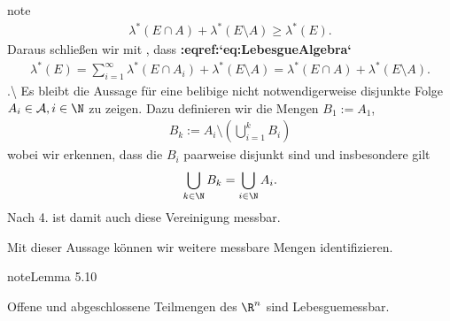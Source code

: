 \documentclass[letterpaper,10pt,english]{jupyterBook}
\begin{document}
\begin{sphinxadmonition}{note}
\begin{equation*}
\begin{split}
\lambda^\ast(E\cap A) + \lambda^\ast(E\setminus A) \geq \lambda^\ast(E).\end{split}
\end{equation*}
\sphinxAtStartPar
Daraus schließen wir mit , dass {\color{red}\bfseries{}:eqref:`eq:LebesgueAlgebra`}
\begin{equation*}
\begin{split}\lambda^\ast(E) = \sum_{i=1}^\infty \lambda^\ast(E\cap A_i) + \lambda^\ast(E\setminus A) =
\lambda^\ast(E\cap A) + \lambda^\ast(E\setminus A).\end{split}
\end{equation*}
.\textbackslash{} Es bleibt die Aussage für eine belibige nicht notwendigerweise disjunkte Folge \(A_i\in\mathcal{A}, i\in\N\) zu zeigen. Dazu definieren wir die Mengen \(B_1:=A_1\),
\begin{equation*}
\begin{split}B_k := A_i\setminus \left(\bigcup_{i=1}^k B_i  \right)\end{split}
\end{equation*}
\sphinxAtStartPar
wobei wir erkennen, dass die \(B_i\) paarweise disjunkt sind und insbesondere gilt
\begin{equation*}
\begin{split}\bigcup_{k\in\N} B_k = \bigcup_{i\in\N} A_i.\end{split}
\end{equation*}
\sphinxAtStartPar
Nach 4. ist damit auch diese Vereinigung messbar.
\end{sphinxadmonition}

\sphinxAtStartPar
Mit dieser Aussage können wir weitere messbare Mengen identifizieren.
\label{masstheorie/masstheorie:thm:lebesgueOffenAbgeschlossen}
\begin{sphinxadmonition}{note}{Lemma 5.10}



\sphinxAtStartPar
Offene und abgeschlossene Teilmengen des \(\R^n\) sind Lebesgue\sphinxhyphen{}messbar.
\end{sphinxadmonition}
\end{document}
